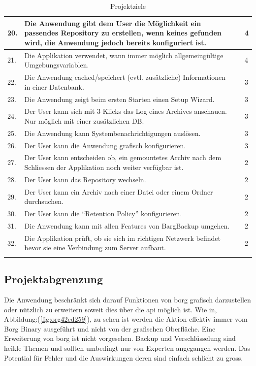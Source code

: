 \begin{longtable}{|p{1cm}|p{9cm}|p{1.5cm}|p{2cm}|}
\hline
20. & Die Anwendung gibt dem User die Möglichkeit ein passendes Repository zu erstellen, wenn keines gefunden wird, die Anwendung jedoch bereits konfiguriert ist. &  & 4\\
\hline
21. & Die Applikation verwendet, wann immer möglich allgemeingültige Umgebungsvariablen. &  & 4\\
\hline
22. & Die Anwendung cached/speichert (evtl. zusätzliche) Informationen in einer Datenbank. &  & 3\\
\hline
23. & Die Anwendung zeigt beim ersten Starten einen Setup Wizard. &  & 3\\
\hline
24. & Der User kann sich mit 3 Klicks das Log eines Archives anschauen. Nur möglich mit einer zusätzlichen DB. &  & 3\\
\hline
25. & Die Anwendung kann Systembenachrichtigungen auslösen. &  & 3\\
\hline
26. & Der User kann die Anwendung grafisch konfigurieren. &  & 3\\
\hline
27. & Der User kann entscheiden ob, ein gemountetes Archiv nach dem Schliessen der Applikation noch weiter verfügbar ist. &  & 2\\
\hline
28. & Der User kann das Repository wechseln. &  & 2\\
\hline
29. & Der User kann ein Archiv nach einer Datei oder einem Ordner durchsuchen. &  & 2\\
\hline
30. & Der User kann die "`Retention Policy"' konfigurieren. &  & 2\\
\hline
31. & Die Anwendung kann mit allen Features von BargBackup umgehen. &  & 2\\
\hline
32. & Die Applikation prüft, ob sie sich im richtigen Netzwerk befindet bevor sie eine Verbindung zum Server aufbaut. &  & 2\\
\hline
\caption{\label{tab:org56dc371}
Projektziele}
\\
\end{longtable}
\newpage

\subsection{Projektabgrenzung}
\label{sec:orgfdd7b17}

Die Anwendung beschränkt sich darauf Funktionen von \gls{borg} grafisch
darzustellen oder nützlich zu erweitern soweit dies über die \gls{api} möglich
ist. Wie in, Abbildung:(\ref{fig:org42cd259}), zu sehen ist werden die Aktion effektiv
immer vom Borg Binary ausgeführt und nicht von der grafischen Oberfläche. Eine
Erweiterung von \gls{borg} ist nicht vorgesehen. Backup und Verschlüsselung sind
heikle Themen und sollten umbedingt nur von Experten angegangen werden. Das
Potential für Fehler und die Auswirkungen deren sind einfach schlicht zu gross.

